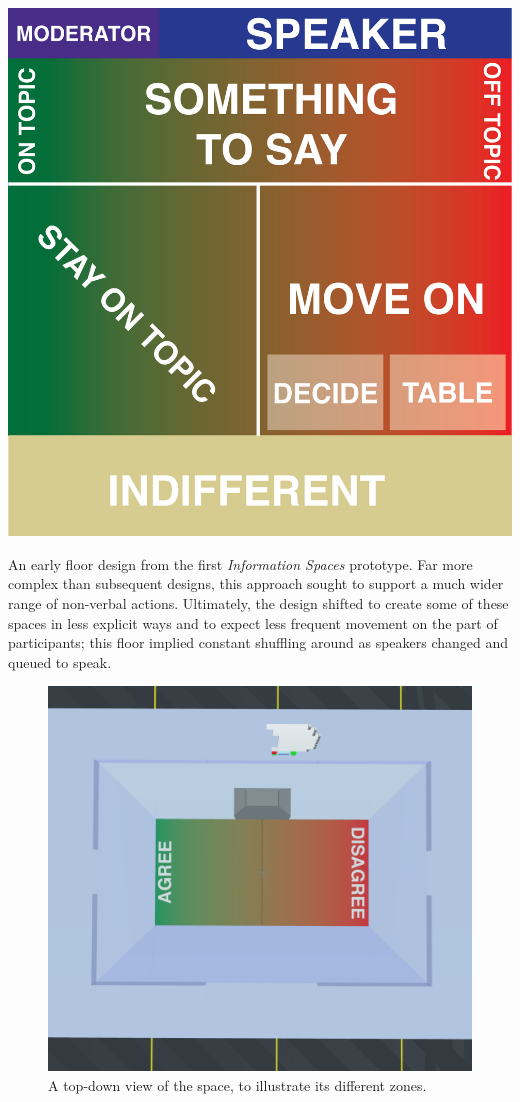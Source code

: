\begin{marginfigure}
	\includegraphics{figures/agree-disagree-redux-floor.png}
	\caption{An early floor design from the first \emph{Information Spaces} prototype. Far more complex than subsequent designs, this approach sought to support a much wider range of non-verbal actions. Ultimately, the design shifted to create some of these spaces in less explicit ways and to expect less frequent movement on the part of participants; this floor implied constant shuffling around as speakers changed and queued to speak.}
	\label{fig:agree_disagree_initia_design}
\end{marginfigure}


\begin{figure}[t]
	\includegraphics{figures/layout.png}
	\caption{A top-down view of the space, to illustrate its different zones.}
	\label{fig:information_space_layout}
\end{figure}

